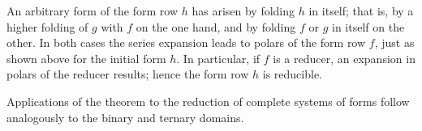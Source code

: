 \documentclass[11pt]{article}
\begin{document}
An arbitrary form of the form row $h$ has arisen by folding $h$ in itself;
that is, by a higher folding of $g$ with $f$ on the one hand, and by folding
$f$ or $g$ in itself on the other. In both cases the series expansion leads
to polars of the form row $f$, just as shown above for the initial form
$h$. In particular, if $f$ is a reducer, an expansion in polars of the
reducer results; hence the form row $h$ is reducible.

Applications of the theorem to the reduction of complete systems of forms
follow analogously to the binary and ternary domains.
\end{document}
